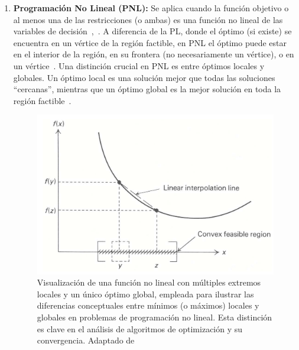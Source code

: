 \begin{enumerate}[label=\arabic*.]
    \item \textbf{Programación No Lineal (PNL):}
    Se aplica cuando la función objetivo o al menos una de las restricciones (o ambas) es una función no lineal de las variables de decisión~\cite[p.~9]{sinha2006},~\cite[p.~410]{nocedal2006}. A diferencia de la PL, donde el óptimo (si existe) se encuentra en un vértice de la región factible, en PNL el óptimo puede estar en el interior de la región, en su frontera (no necesariamente un vértice), o en un vértice~\cite[p.~413, Figura 13.1]{nocedal2006}. Una distinción crucial en PNL es entre óptimos locales y globales. Un óptimo local es una solución mejor que todas las soluciones ``cercanas'', mientras que un óptimo global es la mejor solución en toda la región factible~\cite[p.~413]{nocedal2006}. \\

    \begin{figure}
        \centering
        \includegraphics[width=0.75\linewidth]{img/marcoTeorico/mathprogramming_fig2.png}
        \caption{Visualización de una función no lineal con múltiples extremos locales y un único óptimo global, empleada para ilustrar las diferencias conceptuales entre mínimos (o máximos) locales y globales en problemas de programación no lineal. Esta distinción es clave en el análisis de algoritmos de optimización y su convergencia. Adaptado de~\cite[p.~419]{bradley1977applied}}%
        \label{fig:mathprogramming01}
    \end{figure}


\end{enumerate}
